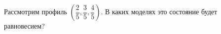 \solution %

\task
Рассмотрим профиль $\left(\dfrac{2}{5}, \dfrac{3}{5}, \dfrac{4}{5}\right)$. В каких моделях это состояние будет равновесием?
\begin{enumerate}[label=$\square$]
	
	
	
	
	
	

\end{enumerate}
